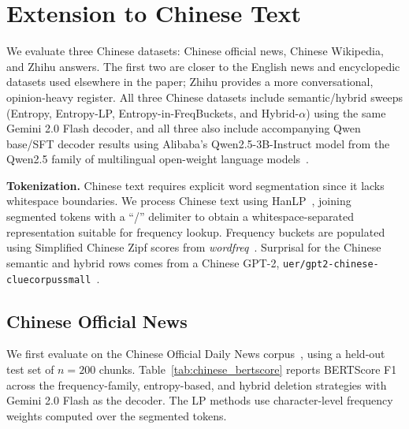 \documentclass[11pt]{article}
\begin{document}
\section{Extension to Chinese Text}
\label{app:chinese_eval}

We evaluate three Chinese datasets: Chinese official news,
Chinese Wikipedia, and Zhihu answers. The first two are closer to the English
news and encyclopedic datasets used elsewhere in the paper; Zhihu provides a
more conversational, opinion-heavy register. All three Chinese datasets include semantic/hybrid sweeps (Entropy, Entropy-LP,
Entropy-in-FreqBuckets, and Hybrid-$\alpha$) using the same Gemini 2.0 Flash
decoder, and all three also include accompanying Qwen base/SFT decoder
results using Alibaba's Qwen2.5-3B-Instruct model from the Qwen2.5 family of
multilingual open-weight language models~\citep{yang2024qwen25}.

\textbf{Tokenization.}
Chinese text requires explicit word segmentation since it lacks whitespace boundaries.
We process Chinese text using HanLP~\citep{hanlp}, joining segmented tokens with
a ``/'' delimiter to obtain a whitespace-separated representation suitable for frequency
lookup. Frequency buckets are populated using Simplified Chinese Zipf scores from
\textit{wordfreq}~\citep{speer2022wordfreq}. Surprisal for the Chinese semantic and hybrid rows comes from a Chinese GPT-2, \texttt{uer/gpt2-chinese-cluecorpussmall}~\citep{zhao2019uer}.

\subsection*{Chinese Official News}

We first evaluate on the Chinese Official Daily News corpus~\citep{chinesenews2016kaggle},
using a held-out test set of $n{=}200$ chunks. Table~\ref{tab:chinese_bertscore} reports
BERTScore F1 across the frequency-family, entropy-based, and hybrid deletion strategies
with Gemini 2.0 Flash as the decoder. The LP methods use character-level frequency weights
computed over the segmented tokens. 
\end{document}
